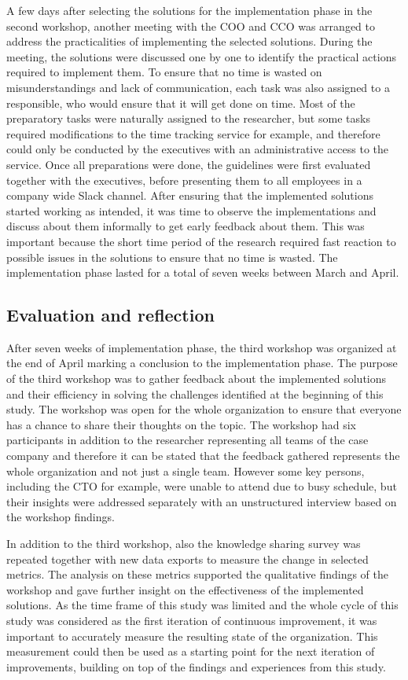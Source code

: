 A few days after selecting the solutions for the implementation phase in the second workshop, another meeting with the COO and CCO was arranged to address the practicalities of
implementing the selected solutions. During the meeting, the solutions were discussed one by one to identify the practical actions required to implement them.
To ensure that no time is wasted on misunderstandings and lack of communication, each task was also assigned to a responsible, who would ensure that it will get done
on time. Most of the preparatory tasks were naturally assigned to the researcher, but some tasks required modifications to the time tracking service for example,
and therefore could only be conducted by the executives with an administrative access to the service. Once all preparations were done, the guidelines were first evaluated together
with the executives, before presenting them to all employees in a company wide Slack channel. After ensuring that the implemented solutions started working as intended,
it was time to observe the implementations and discuss about them informally to get early feedback about them. This was important because the short time period of the
research required fast reaction to possible issues in the solutions to ensure that no time is wasted. The implementation phase lasted for a total of seven weeks between
March and April.

\subsection{Evaluation and reflection}

After seven weeks of implementation phase, the third workshop was organized at the end of April marking a conclusion to the implementation phase.
The purpose of the third workshop was to gather feedback about the implemented solutions and their efficiency in solving the challenges identified at the beginning of this study.
The workshop was open for the whole organization to ensure that everyone has a chance to share their thoughts on the topic. The workshop had six participants in addition to the researcher
representing all teams of the case company and therefore it can be stated that the feedback gathered represents the whole organization and not just a single team. However some key
persons, including the CTO for example, were unable to attend due to busy schedule, but their insights were addressed separately with an unstructured interview based on the workshop findings.

In addition to the third workshop, also the knowledge sharing survey was repeated together with new data exports to measure the change in selected metrics. The analysis on these metrics
supported the qualitative findings of the workshop and gave further insight on the effectiveness of the implemented solutions. As the time frame of this study was limited and the whole cycle of
this study was considered as the first iteration of continuous improvement, it was important to accurately measure the resulting state of the organization. This measurement could then
be used as a starting point for the next iteration of improvements, building on top of the findings and experiences from this study.
